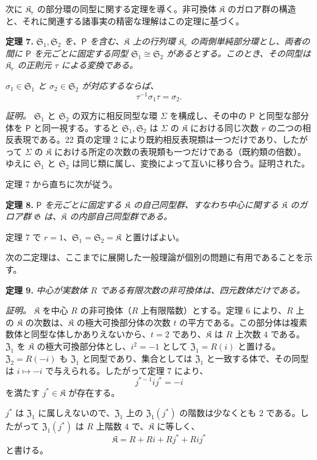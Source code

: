 次に $\mathfrak K_r$ の部分環の同型に関する定理を導く。非可換体 $\mathfrak K$ のガロア群の構造と、それに関連する諸事実の精密な理解はこの定理に基づく。

\textbf{定理 7.} \emph{$\mathfrak S_1,\mathfrak S_2$ を、$\mathsf P$ を含む、$\mathfrak K$ 上の行列環 $\mathfrak K_r$ の両側単純部分環とし、両者の間に $\mathsf P$ を元ごとに固定する同型 $\mathfrak S_1\cong\mathfrak S_2$ があるとする。このとき、その同型は $\mathfrak K_r$ の正則元 $\tau$ による変換である。}

\emph{$\sigma_1\in\mathfrak S_1$ と $\sigma_2\in\mathfrak S_2$ が対応するならば、}
\[
\tau^{-1}\sigma_1\tau=\sigma_2.
\]

\emph{証明。} $\mathfrak S_1$ と $\mathfrak S_2$ の双方に相反同型な環 $\Sigma$ を構成し、その中の $\mathsf P$ と同型な部分体を $\mathsf P$ と同一視する。すると $\mathfrak S_1,\mathfrak S_2$ は $\Sigma$ の $\mathfrak K$ における同じ次数 $r$ の二つの相反表現である。22 頁の定理 2 により既約相反表現類は一つだけであり、したがって $\Sigma$ の $\mathfrak K$ における所定の次数の表現類も一つだけである（既約類の倍数）。ゆえに $\mathfrak S_1$ と $\mathfrak S_2$ は同じ類に属し、変換によって互いに移り合う。証明された。

定理 7 から直ちに次が従う。

\textbf{定理 8.} \emph{$\mathsf P$ を元ごとに固定する $\mathfrak K$ の自己同型群、すなわち中心に関する $\mathfrak K$ のガロア群 $\mathfrak G$ は、$\mathfrak K$ の内部自己同型群である。}

定理 7 で $r=1$、$\mathfrak S_1=\mathfrak S_2=\mathfrak K$ と置けばよい。

次の二定理は、ここまでに展開した一般理論が個別の問題に有用であることを示す。

\textbf{定理 9.} \emph{中心が実数体 $R$ である有限次数の非可換体は、四元数体だけである。}

\emph{証明。} $\mathfrak K$ を中心 $R$ の非可換体（$R$ 上有限階数）とする。定理 6 により、$R$ 上の $\mathfrak K$ の次数は、$\mathfrak K$ の極大可換部分体の次数 $t$ の平方である。この部分体は複素数体と同型な体しかありえないから、$t=2$ であり、$\mathfrak K$ は $R$ 上次数 $4$ である。$\mathfrak Z_1$ を $\mathfrak K$ の極大可換部分体とし、$i^2=-1$ として $\mathfrak Z_1=R(i)$ と置ける。$\mathfrak Z_2=R(-i)$ も $\mathfrak Z_1$ と同型であり、集合としては $\mathfrak Z_1$ と一致する体で、その同型は $i\mapsto-i$ で与えられる。したがって定理 7 により、
\[
j^{*-1}ij^*=-i
\]
を満たす $j^*\in\mathfrak K$ が存在する。

$j^*$ は $\mathfrak Z_1$ に属しえないので、$\mathfrak Z_1$ 上の $\mathfrak Z_1(j^*)$ の階数は少なくとも $2$ である。したがって $\mathfrak Z_1(j^*)$ は $R$ 上階数 $4$ で、$\mathfrak K$ に等しく、
\[
\mathfrak K=R+Ri+Rj^*+Rij^*
\]
と書ける。

